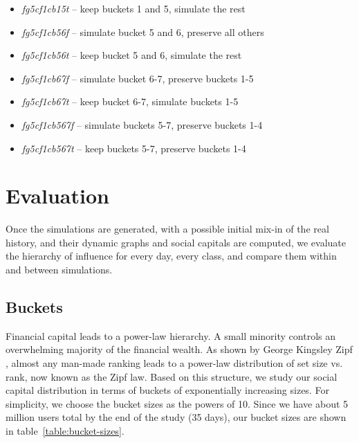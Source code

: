 \documentclass[10pt,oneside]{memoir}
\begin{document}
\begin{itemize}
\item {\itshape fg5cf1c{\itshape {\itshape b15t}}} -- keep buckets 1 and 5, simulate the rest

\item {\itshape fg5cf1c{\itshape {\itshape b56f}}} -- simulate bucket 5 and 6, preserve all others

\item {\itshape fg5cf1c{\itshape {\itshape b56t}}} -- keep bucket 5 and 6, simulate the rest

\item {\itshape fg5cf1c{\itshape {\itshape b67f}}} -- simulate bucket 6-7, preserve buckets 1-5

\item {\itshape fg5cf1c{\itshape {\itshape b67t}}} -- keep bucket 6-7, simulate buckets 1-5

\item {\itshape fg5cf1c{\itshape {\itshape b567f}}} -- simulate buckets 5-7, preserve buckets 1-4

\item {\itshape fg5cf1c{\itshape {\itshape b567t}}} -- keep buckets 5-7, preserve buckets 1-4
\end{itemize}



\pagebreak \section{Evaluation}
\label{evaluation}

Once the simulations are generated, with a possible initial mix-in of the real history, and their dynamic graphs and social capitals are computed, we evaluate the hierarchy of influence for every day, every class, and compare them within and between simulations.


\subsection{Buckets}
\label{buckets}

Financial capital leads to a power-law hierarchy.  A small minority controls an overwhelming majority of the financial wealth.  As shown by George Kingsley Zipf \cite{zipf1949humanbehavior}, almost any man-made ranking leads to a power-law distribution of set size vs. rank, now known as the Zipf law.  Based on this structure, we study our social capital distribution in terms of buckets of exponentially increasing sizes.
For simplicity, we choose the bucket sizes as the powers of 10.  Since we have about 5 million users total by the end of the study (35 days), our bucket sizes are shown in table~\ref{table:bucket-sizes}.
\end{document}
